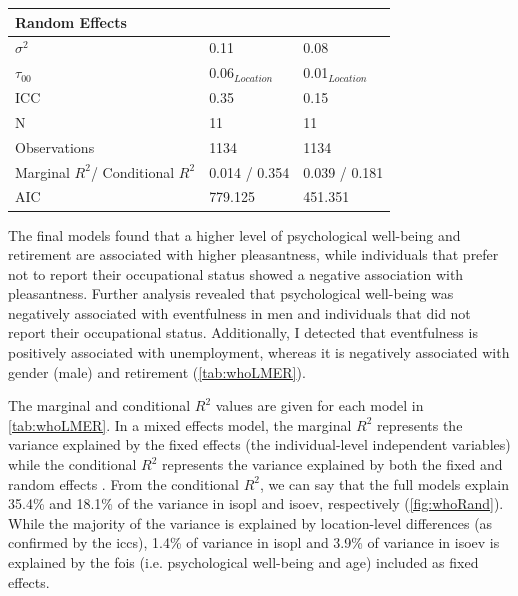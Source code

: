 {\begin{landscape}
\begin{table}[hp]
\begin{tabular}{@{}lcccccc@{}}
  \midrule
  \multicolumn{7}{l}{\textbf{Random Effects}} \\ 
  \midrule
  $\sigma^2$         & \multicolumn{3}{l|}{0.11}               & \multicolumn{3}{l}{0.08}              \\
  $\tau_{00}$        & \multicolumn{3}{l|}{0.06$_{Location}$}  & \multicolumn{3}{l}{0.01$_{Location}$} \\
  ICC                & \multicolumn{3}{l|}{0.35}               & \multicolumn{3}{l}{0.15}              \\
  N                  & \multicolumn{3}{l|}{11}                 & \multicolumn{3}{l}{11}                \\
  \midrule
  Observations       & \multicolumn{3}{l|}{1134}               & \multicolumn{3}{l}{1134}          \\
  Marginal $R^2$/%
  Conditional $R^2$  & \multicolumn{3}{l|}{0.014 / 0.354}      & \multicolumn{3}{l}{0.039 / 0.181} \\
  AIC                & \multicolumn{3}{l|}{779.125}            & \multicolumn{3}{l}{451.351}       \\
  \bottomrule
  \end{tabular}
  \end{table}
  \end{landscape}
}

  The final models found that a higher level of psychological well-being and retirement are associated with higher pleasantness, while individuals that prefer not to report their occupational status showed a negative association with pleasantness. Further analysis revealed that psychological well-being was negatively associated with eventfulness in men and individuals that did not report their occupational status. Additionally, I detected that eventfulness is positively associated with unemployment, whereas it is negatively associated with gender (male) and retirement (\cref{tab:whoLMER}). 

  The marginal and conditional $R^2$ values are given for each model in \cref{tab:whoLMER}. In a mixed effects model, the marginal $R^2$ represents the variance explained by the fixed effects (the individual-level independent variables) while the conditional $R^2$ represents the variance explained by both the fixed and random effects \citep{Nakagawa2012general}. From the conditional $R^2$, we can say that the full models explain 35.4\% and 18.1\% of the variance in \gls{isopl} and \gls{isoev}, respectively (\cref{fig:whoRand}). While the majority of the variance is explained by location-level differences (as confirmed by the \glspl{icc}), 1.4\% of variance in \gls{isopl} and 3.9\% of variance in \gls{isoev} is explained by the \glspl{foi} (i.e. psychological well-being and age) included as fixed effects.

